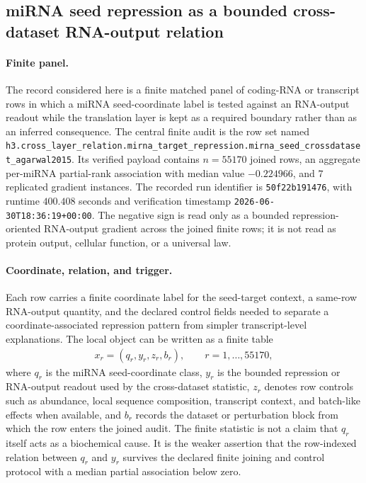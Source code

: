 \subsection{miRNA seed repression as a bounded cross-dataset RNA-output relation}\label{sec:bioreality-mirna-seed-crossdataset-agarwal2015}

\paragraph{Finite panel.}
The record considered here is a finite matched panel of coding-RNA or transcript rows in which a miRNA seed-coordinate label is tested against an RNA-output readout while the translation layer is kept as a required boundary rather than as an inferred consequence.  The central finite audit is the row set named \texttt{h3.cross\_layer\_relation.mirna\_target\_repression.mirna\_seed\_crossdataset\_agarwal2015}.  Its verified payload contains $n=55170$ joined rows, an aggregate per-miRNA partial-rank association with median value $-0.224966$, and $7$ replicated gradient instances.  The recorded run identifier is \texttt{50f22b191476}, with runtime $400.408$ seconds and verification timestamp \texttt{2026-06-30T18:36:19+00:00}.  The negative sign is read only as a bounded repression-oriented RNA-output gradient across the joined finite rows; it is not read as protein output, cellular function, or a universal law.

\paragraph{Coordinate, relation, and trigger.}
Each row carries a finite coordinate label for the seed-target context, a same-row RNA-output quantity, and the declared control fields needed to separate a coordinate-associated repression pattern from simpler transcript-level explanations.  The local object can be written as a finite table
$$
\begin{aligned}
  x_r=(q_r,y_r,z_r,b_r), \qquad r=1,\ldots,55170,
\end{aligned}
$$
where $q_r$ is the miRNA seed-coordinate class, $y_r$ is the bounded repression or RNA-output readout used by the cross-dataset statistic, $z_r$ denotes row controls such as abundance, local sequence composition, transcript context, and batch-like effects when available, and $b_r$ records the dataset or perturbation block from which the row enters the joined audit.  The finite statistic is not a claim that $q_r$ itself acts as a biochemical cause.  It is the weaker assertion that the row-indexed relation between $q_r$ and $y_r$ survives the declared finite joining and control protocol with a median partial association below zero.

